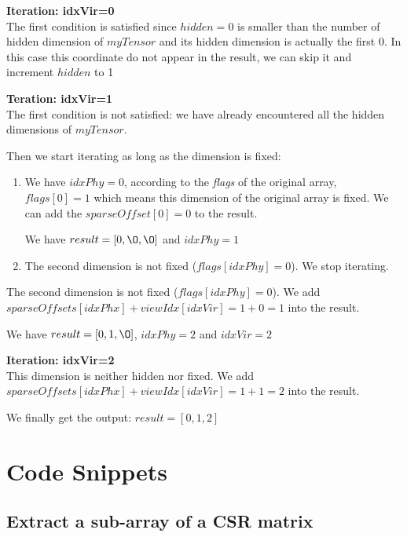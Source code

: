 	\textbf{Iteration: idxVir=0}\\
	The first condition is satisfied since $hidden=0$ is smaller than the number of hidden dimension of $myTensor$ and its hidden dimension is actually the first 0. In this case this coordinate do not appear in the result, we can skip it and increment $hidden$ to 1
	
	\textbf{Teration: idxVir=1}\\
	The first condition is not satisfied: we have already encountered all the hidden dimensions of $myTensor$.
	
	Then we start iterating as long as the dimension is fixed:
	\begin{enumerate}
		\item  We have $idxPhy=0$, according to the \textit{flags} of the original array, $flags[0] = 1$ which means this dimension of the original array is fixed. We can add the $sparseOffset[0] = 0$ to the result.
		
		We have $result = [0, \O, \O]$ and $idxPhy=1$
		
		\item The second dimension is not fixed ($flags[idxPhy] = 0$). We stop iterating.
	\end{enumerate}
	
	The second dimension is not fixed ($flags[idxPhy] = 0$).  We add $sparseOffsets[idxPhx] + viewIdx[idxVir] = 1 + 0 =  1$ into the result.
	
	We have $result = [0, 1, \O]$, $idxPhy=2$ and $idxVir=2$
	
	\textbf{Iteration: idxVir=2}\\
	This dimension is neither hidden nor fixed. We add $sparseOffsets[idxPhx] + viewIdx[idxVir] = 1 + 1 =  2$ into the result.
	
	We finally get the output: $result = [0, 1, 2]$
	
\section{Code Snippets}
\label{ch:codesnip}
\subsection{Extract a sub-array of a CSR matrix}

